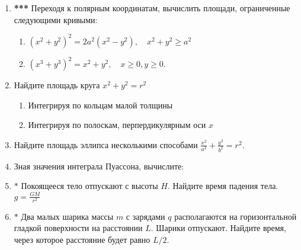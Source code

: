 \begin{enumerate}
\begin{enumerate}
\begin{minipage}{0.5\textwidth}
    \end{minipage}
    \end{enumerate}
    \item \textbf{***} Переходя к полярным координатам, вычислить площади, ограниченные следующими кривыми:
    \begin{enumerate}
        \item $(x^2 + y^2)^2 = 2a^2(x^2 - y^2),\quad x^2 + y^2 \ge a^2$
        \item $(x^3 + y^3)^2 = x^2 + y^2, \quad x \ge 0, y \ge 0.$
    \end{enumerate}
    \item Найдите площадь круга $x^2+y^2=r^2$ 
    \begin{enumerate}
        \item Интегрируя по кольцам малой толщины
        \item Интегрируя по полоскам, перпердикулярным оси $x$
    \end{enumerate}
    \item Найдите площадь эллипса несколькими способами $\displaystyle \frac{x^2}{a^2}+\frac{y^2}{b^2}=r^2$.
    \item Зная значения интеграла Пуассона, вычислите:
    \item $\boldsymbol{*}$ Покоящееся тело отпускают с высоты $H$. Найдите время падения тела. $\displaystyle g = \frac{GM}{r^2}$
    \item $\boldsymbol{*}$ Два малых шарика  массы $m$ с зарядами $q$ располагаются на горизонтальной гладкой поверхности на расстоянии $L$. Шарики отпускают. Найдите время, через которое расстояние будет равно $L/2$.

\end{enumerate}
